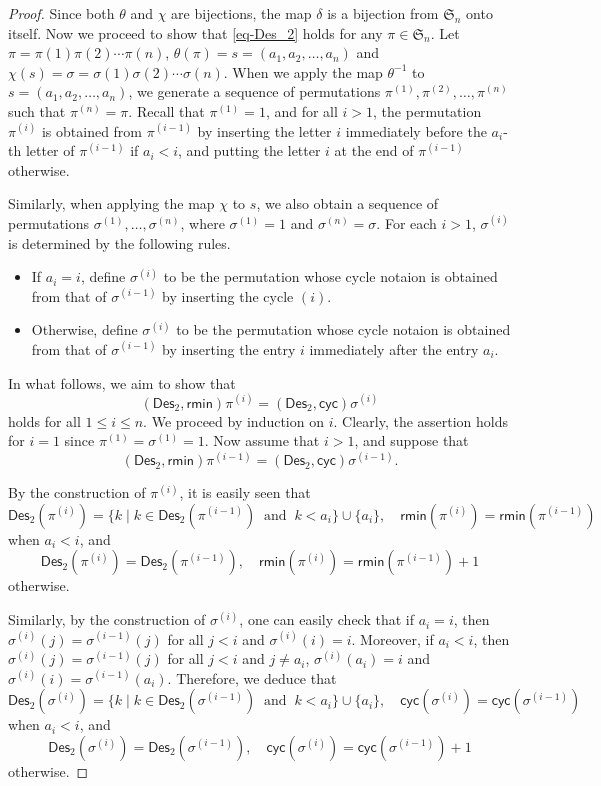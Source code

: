 \documentclass[12pt]{article}
\numberwithin{equation}{section}
\theoremstyle{plain}
\def\cyc{\mathsf{cyc}}
\def\Des{\mathsf{Des}}
\def\rmin{\mathsf{rmin}}
\begin{document}
     \begin{proof}
    Since both   $\theta$ and $\chi$ are bijections, the map $\delta$   is a bijection from   $\mathfrak{S}_n$ onto itself.  Now we proceed to  show that \eqref{eq-Des_2} holds for any $\pi\in \mathfrak{S}_n$. Let $\pi=\pi(1)\pi(2)\cdots\pi(n)$, $\theta(\pi)=s=(a_1,a_2,\ldots,a_n)$ and $\chi(s)=\sigma=\sigma(1)\sigma(2)\cdots\sigma(n)$. When we apply the map $\theta^{-1}$ to $s=(a_1,a_2,\ldots,a_n)$, we generate a sequence of permutations $\pi^{(1)},\pi^{(2)},\ldots,\pi^{(n)}$ such that $\pi^{(n)}=\pi$. Recall that $\pi^{(1)}=1$, and for all $i>1$, the permutation $\pi^{(i)}$ is obtained from $\pi^{(i-1)}$ by inserting the letter $i$ immediately before the $a_i$-th letter of $\pi^{(i-1)}$ if $a_i<i$, and putting the letter $i$ at the end of $\pi^{(i-1)}$ otherwise.
     
     Similarly, when applying the map $\chi$ to $s$, we also obtain a sequence of permutations $\sigma^{(1)},\ldots,\sigma^{(n)}$, where $\sigma^{(1)}=1$ and $\sigma^{(n)}=\sigma$. For  each  $i>1$,   $\sigma^{(i)}$ is determined by the following rules.
     \begin{itemize}
     	\item If $a_i = i$, define   $\sigma^{(i)}$ to be the permutation  whose cycle notaion is obtained from that  of $\sigma^{(i-1)}$ by inserting the cycle $(i)$.
     	\item Otherwise, define   $\sigma^{(i)}$ to be the permutation  whose cycle notaion is obtained from that of   $\sigma^{(i-1)}$ by  inserting  the entry $i$ immediately after the entry $a_i$. 
     \end{itemize}
     
     In what follows, we aim to show that
     \[
     (\Des_2, \rmin)\pi^{(i)}= (\Des_2, \cyc)\sigma^{(i)}
     \]
     holds for all $1\leq i\leq n$. We proceed by induction on $i$. Clearly, the assertion holds for $i=1$ since $\pi^{(1)}=\sigma^{(1)}=1$. Now assume that $i>1$, and suppose that
     \[
     (\Des_2, \rmin)\pi^{(i-1)}= (\Des_2, \cyc)\sigma^{(i-1)}.
     \]
     
     By the construction of $\pi^{(i)}$, it is easily seen that
     \[
     \Des_2(\pi^{(i)})= \{k\mid  k\in \Des_2(\pi^{(i-1)}) \;\; \mbox{and}\;\; k<a_i\}  \cup\{a_i\},\quad \rmin(\pi^{(i)})=\rmin(\pi^{(i-1)})
     \]
     when $a_i<i$, and
     \[
     \Des_2(\pi^{(i)})= \Des_2(\pi^{(i-1)}),\quad \rmin(\pi^{(i)})=\rmin(\pi^{(i-1)})+1
     \]
     otherwise.
     
     Similarly, by the construction of $\sigma^{(i)}$, one can easily check that if $a_i=i$, then $\sigma^{(i)}(j)=\sigma^{(i-1)}(j)$ for all $j<i$ and $\sigma^{(i)}(i)=i$. Moreover, if $a_i<i$, then $\sigma^{(i)}(j)=\sigma^{(i-1)}(j)$ for all $j<i$ and $j\neq a_i$, $\sigma^{(i)}(a_i)=i$ and $\sigma^{(i)}(i)=\sigma^{(i-1)}(a_i)$. Therefore, we deduce that
     \[
     \Des_2(\sigma^{(i)})= \{k\mid  k\in \Des_2(\sigma^{(i-1)})\;\; \mbox{and}\;\; k<a_i \}\cup\{a_i\},\quad \cyc(\sigma^{(i)})=\cyc(\sigma^{(i-1)})
     \]
     when $a_i<i$, and
     \[
     \Des_2(\sigma^{(i)})= \Des_2(\sigma^{(i-1)}),\quad \cyc(\sigma^{(i)})=\cyc(\sigma^{(i-1)})+1
     \]
     otherwise.
     

\end{proof}
\end{document}
